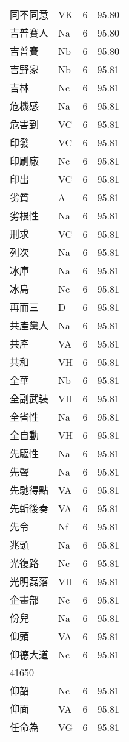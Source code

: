 \documentclass[twocolumn]{book}
\begin{document}
\begin{supertabular}{llrr}
同不同意 & VK & 6 &  95.80\\
吉普賽人 & Na & 6 &  95.80\\
吉普賽 & Nb & 6 &  95.80\\
吉野家 & Nb & 6 &  95.81\\
吉林 & Nc & 6 &  95.81\\
危機感 & Na & 6 &  95.81\\
危害到 & VC & 6 &  95.81\\
印發 & VC & 6 &  95.81\\
印刷廠 & Nc & 6 &  95.81\\
印出 & VC & 6 &  95.81\\
劣質 & A & 6 &  95.81\\
劣根性 & Na & 6 &  95.81\\
刑求 & VC & 6 &  95.81\\
列次 & Na & 6 &  95.81\\
冰庫 & Na & 6 &  95.81\\
冰島 & Nc & 6 &  95.81\\
再而三 & D & 6 &  95.81\\
共產黨人 & Na & 6 &  95.81\\
共產 & VA & 6 &  95.81\\
共和 & VH & 6 &  95.81\\
全華 & Nb & 6 &  95.81\\
全副武裝 & VH & 6 &  95.81\\
全省性 & Na & 6 &  95.81\\
全自動 & VH & 6 &  95.81\\
先驅性 & Na & 6 &  95.81\\
先聲 & Na & 6 &  95.81\\
先馳得點 & VA & 6 &  95.81\\
先斬後奏 & VA & 6 &  95.81\\
先令 & Nf & 6 &  95.81\\
兆頭 & Na & 6 &  95.81\\
光復路 & Nc & 6 &  95.81\\
光明磊落 & VH & 6 &  95.81\\
企畫部 & Nc & 6 &  95.81\\
份兒 & Na & 6 &  95.81\\
仰頭 & VA & 6 &  95.81\\
仰德大道 & Nc & 6 &  95.81\\
41650\\
仰韶 & Nc & 6 &  95.81\\
仰面 & VA & 6 &  95.81\\
任命為 & VG & 6 &  95.81\\

\end{supertabular}
\end{document}
